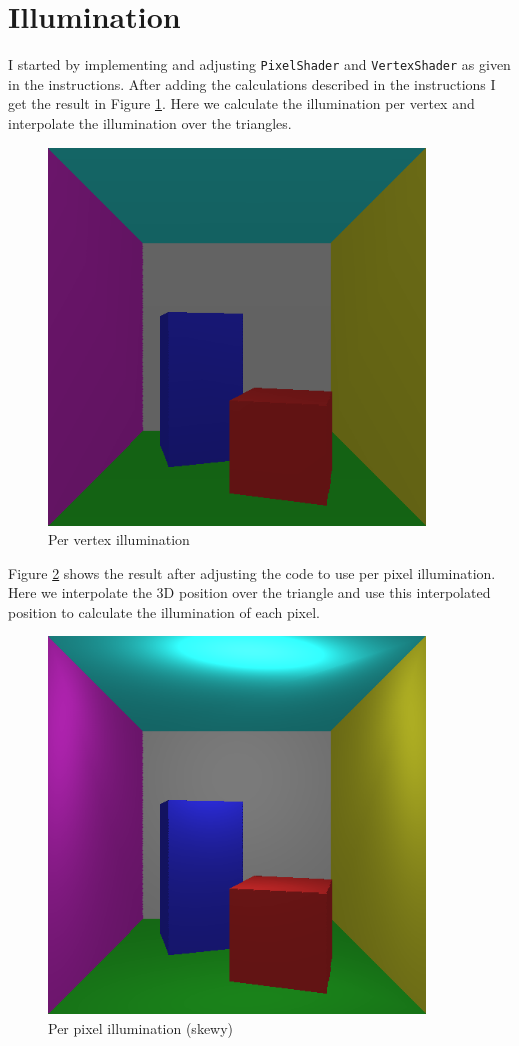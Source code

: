\section{Illumination}
I started by implementing and adjusting \texttt{PixelShader} and \texttt{VertexShader} as given in the instructions.
After adding the calculations described in the instructions I get the result in Figure \ref{fig:perVertexIll}. 
Here we calculate the illumination per vertex and interpolate the illumination over the triangles.
\begin{figure}[ht]
    \centering
    \includegraphics[width=10cm]{screenshots/per_vertex_illumination.png}
    \caption{Per vertex illumination}
    \label{fig:perVertexIll}
\end{figure}
Figure \ref{fig:perPixelIllSkewy} shows the result after adjusting the code to use per pixel illumination. Here we interpolate the 3D position
over the triangle and use this interpolated position to calculate the illumination of each pixel.
\begin{figure}[ht]
    \centering
    \includegraphics[width=10cm]{screenshots/skewy_per_pixel.png}
    \caption{Per pixel illumination (skewy)}
    \label{fig:perPixelIllSkewy}
\end{figure}
